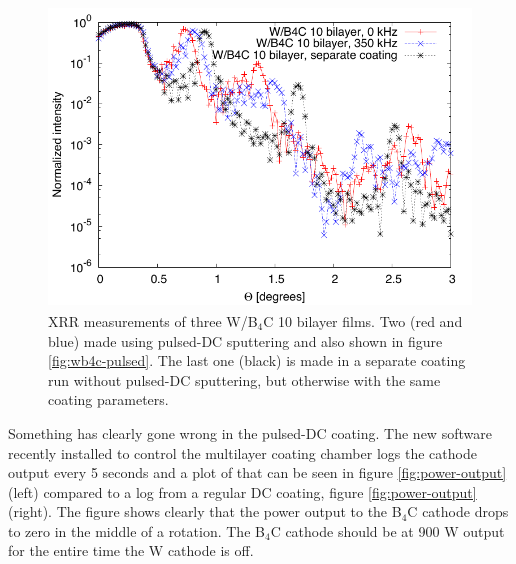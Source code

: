 \begin{figure}[!h]
	\center
	\includegraphics[height=8cm]{figures/athena/coatings/w-b4c-nopulsed.pdf}
\caption{\footnotesize XRR measurements of three W/B$_4$C 10 bilayer films. Two (red and blue) made using pulsed-DC sputtering and also shown in figure \ref{fig:wb4c-pulsed}. The last one (black) is made in a separate coating run without pulsed-DC sputtering, but otherwise with the same coating parameters.}\label{fig:wb4c-nopulsed}
\end{figure}

Something has clearly gone wrong in the pulsed-DC coating. The new software recently installed to control the multilayer coating chamber logs the cathode output every 5 seconds and a plot of that can be seen in figure \ref{fig:power-output}(left) compared to a log from a regular DC coating, figure \ref{fig:power-output}(right). The figure shows clearly that the power output to the B$_4$C cathode drops to zero in the middle of a rotation. The B$_4$C cathode should be at 900 W output for the entire time the W cathode is off.

